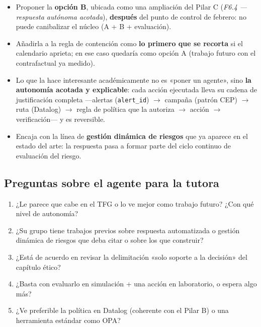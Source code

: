 \documentclass[11pt,a4paper]{article}
\newcommand{\cod}[1]{\texttt{#1}}
\newcommand{\flecha}{$\rightarrow$}
\begin{document}
\begin{nuevo}
\begin{itemize}
  \item Proponer la \textbf{opción B}, ubicada como una ampliación del Pilar C (\textit{F6.4 — respuesta autónoma
        acotada}), \textbf{después} del punto de control de febrero: no puede canibalizar el núcleo (A + B + evaluación).
  \item Añadirla a la regla de contención como \textbf{lo primero que se recorta} si el calendario aprieta; en ese caso
        quedaría como opción A (trabajo futuro con el contrafactual ya medido).
  \item Lo que la hace interesante académicamente no es «poner un agente», sino \textbf{la autonomía acotada y
        explicable}: cada acción ejecutada lleva su cadena de justificación completa —alertas (\cod{alert\_id}) \flecha{}
        campaña (patrón CEP) \flecha{} ruta (Datalog) \flecha{} regla de política que la autoriza \flecha{} acción
        \flecha{} verificación— y es reversible.
  \item Encaja con la línea de \textbf{gestión dinámica de riesgos} que ya aparece en el estado del arte: la respuesta
        pasa a formar parte del ciclo continuo de evaluación del riesgo.
\end{itemize}
\end{nuevo}

\subsection{Preguntas sobre el agente para la tutora}
\begin{enumerate}
  \item ¿Le parece que cabe en el TFG o lo ve mejor como trabajo futuro? ¿Con qué nivel de autonomía?
  \item ¿Su grupo tiene trabajos previos sobre respuesta automatizada o gestión dinámica de riesgos que deba citar o
        sobre los que construir?
  \item ¿Está de acuerdo en revisar la delimitación «solo soporte a la decisión» del capítulo ético?
  \item ¿Basta con evaluarlo en simulación + una acción en laboratorio, o espera algo más?
  \item ¿Ve preferible la política en Datalog (coherente con el Pilar B) o una herramienta estándar como OPA?
\end{enumerate}
\end{document}
